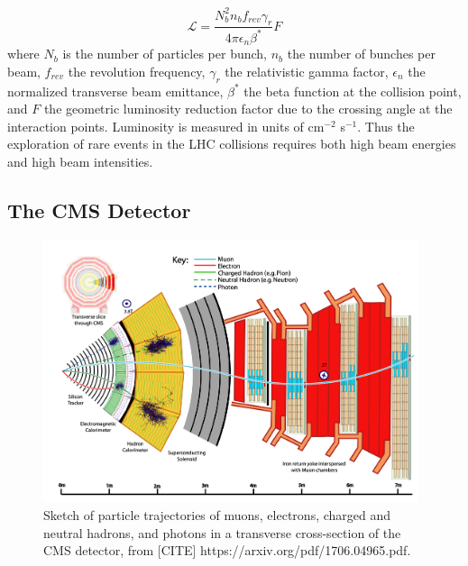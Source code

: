 \documentclass{article}
\begin{document}
\begin{equation}
    \mathcal{L} = \frac{N_b^2 n_b f_{rev} \gamma_r}{4\pi \epsilon_n \beta^*} F
\end{equation}
where $N_b$ is the number of particles per bunch, $n_b$ the number of bunches per beam, $f_{rev}$ the revolution frequency, $\gamma_r$ the relativistic gamma factor, $\epsilon_n$ the normalized transverse beam emittance, $\beta^*$ the beta function at the collision point, and $F$ the geometric luminosity reduction factor due to the crossing angle at the interaction points. Luminosity is measured in units of cm$^{-2}$ s$^{-1}$. Thus the exploration of rare events in the LHC collisions requires both high beam energies and high beam intensities.

\subsection{The CMS Detector}
\label{section:cms-detector}

\begin{figure}[ht]
    \centering
    \includegraphics[width=11cm]{figures/sketch-cms-particle-interactions.png}
    \caption{Sketch of particle trajectories of muons, electrons, charged and neutral hadrons, and photons in a transverse cross-section of the CMS detector, from [CITE] https://arxiv.org/pdf/1706.04965.pdf.}
    \label{fig:sketch-cms-particle-interactions}
\end{figure}
\end{document}
